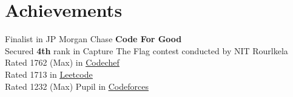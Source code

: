 %
\section{Achievements}
\begin{itemize}[leftmargin=0.15in, label={}]
  \small{\item{
        Finalist in JP Morgan Chase \textbf{Code For Good} \\
        Secured \textbf{4th} rank in Capture The Flag contest conducted by NIT Rourlkela \\
        Rated 1762 (Max) in \href{https://www.codechef.com/users/ashu2909}
        {\underline{Codechef}} \\
        {Rated 1713 in \href{https://leetcode.com/ashu_coderc/}{\underline{Leetcode}}} \\
        Rated 1232 (Max) Pupil in \href{https://codeforces.com/profile/ashucoder}
        {\underline{Codeforces}} \\
        }}


\end{itemize}
